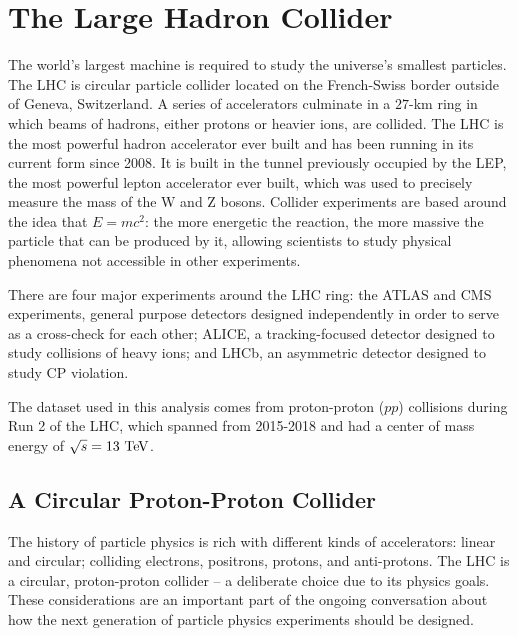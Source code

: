 \chapter{The Large Hadron Collider}
\label{chap:LHC}

The world's largest machine is required to study the universe's smallest particles. The \ac{LHC} is circular particle collider located on the French-Swiss border outside of Geneva, Switzerland. A series of accelerators culminate in a $27$-km ring in which beams of hadrons, either protons or heavier ions, are collided. The \ac{LHC} is the most powerful hadron accelerator ever built and has been running in its current form since 2008. It is built in the tunnel previously occupied by the \acf{LEP}, the most powerful lepton accelerator ever built, which was used to precisely measure the mass of the W and Z bosons. Collider experiments are based around the idea that $E=mc^2$: the more energetic the reaction, the more massive the particle that can be produced by it, allowing scientists to study physical phenomena not accessible in other experiments. 

There are four major experiments around the \ac{LHC} ring: the \ac{ATLAS} and \ac{CMS} experiments, general purpose detectors designed independently in order to serve as a cross-check for each other; \ac{ALICE}, a tracking-focused detector designed to study collisions of heavy ions; and \ac{LHCb}, an asymmetric detector designed to study \ac{CP} violation. 

The dataset used in this analysis comes from proton-proton ($pp$) collisions during Run 2 of the \ac{LHC}, which spanned from 2015-2018 and had a center of mass energy of $\sqrt{s} = 13 \TeV$.



\section{A Circular Proton-Proton Collider}

The history of particle physics is rich with different kinds of accelerators: linear and circular; colliding electrons, positrons, protons, and anti-protons. The \ac{LHC} is a circular, proton-proton collider -- a deliberate choice due to its physics goals. These considerations are an important part of the ongoing conversation about how the next generation of particle physics experiments should be designed. 


